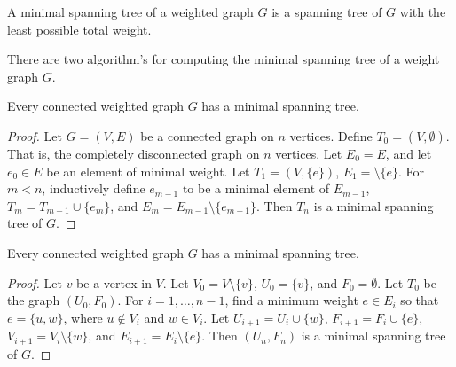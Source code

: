             \begin{definition}
                A minimal spanning tree of a weighted graph $G$
                is a spanning tree of $G$ with the least possible
                total weight.
            \end{definition}
            There are two algorithm's for computing the minimal
            spanning tree of a weight graph $G$.
            \begin{theorem}
                Every connected weighted graph $G$
                has a minimal spanning tree.
            \end{theorem}
            \begin{proof}
                Let $G=(V,E)$ be a connected graph on $n$ vertices.
                Define $T_{0}=(V,\emptyset)$. That is, the completely
                disconnected graph on $n$ vertices. Let $E_{0}=E$,
                and let $e_{0}\in{E}$ be an element of minimal weight.
                Let $T_{1}=(V,\{e\})$, $E_{1}=\setminus\{e\}$.
                For $m<n$, inductively define $e_{m-1}$ to be a minimal
                element of $E_{m-1}$, $T_{m}=T_{m-1}\cup\{e_{m}\}$,
                and $E_{m}=E_{m-1}\setminus\{e_{m-1}\}$.
                Then $T_{n}$ is a minimal spanning tree of $G$.
            \end{proof}
            \begin{theorem}
                Every connected weighted graph $G$ has a minimal
                spanning tree.
            \end{theorem}
            \begin{proof}
                Let $v$ be a vertex in $V$.
                Let $V_{0}=V\setminus\{v\}$,
                $U_{0}=\{v\}$, and $F_{0}=\emptyset$.
                Let $T_{0}$ be the graph $(U_{0},F_{0})$.
                For $i=1,\hdots,n-1$, find a minimum weight
                $e\in{E_{i}}$ so that $e=\{u,w\}$, where
                $u\notin{V_{i}}$ and $w\in{V_{i}}$.
                Let $U_{i+1}=U_{i}\cup\{w\}$,
                $F_{i+1}=F_{i}\cup\{e\}$,
                $V_{i+1}=V_{i}\setminus\{w\}$, and
                $E_{i+1}=E_{i}\setminus\{e\}$.
                Then $(U_{n},F_{n})$ is a minimal spanning tree of
                $G$.
            \end{proof}
